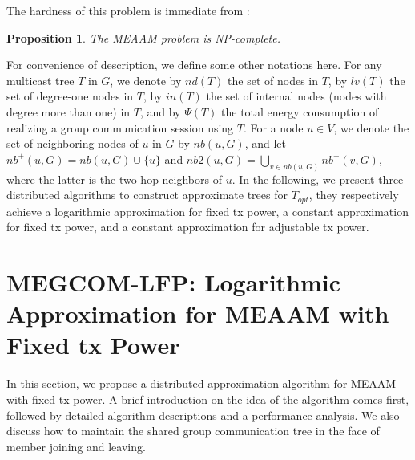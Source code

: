 \documentclass[10pt, conference, compsocconf]{IEEEtran}
\newtheorem{prop}{\textbf{Proposition}}
\begin{document}
  The hardness of this problem is immediate from \cite{Liang2009}:
\begin{prop} \label{prp:NPC}
    The MEAAM problem is NP-complete.
  \end{prop}

  For convenience of description, we define some other notations here. For any multicast tree $T$ in $G$, we denote by $\mathit{nd}(T)$ the set of nodes in $T$, by $\mathit{lv}(T)$ the set of degree-one nodes in $T$, by $\mathit{in}(T)$ the set of internal nodes (nodes with degree more than one) in $T$, and by $\Psi(T)$ the total energy consumption of realizing a group communication session using $T$. For a node $u \in V$, we denote the set of neighboring nodes of $u$ in $G$ by $\mathit{nb}(u,G)$, and let $\mathit{nb}^+(u,G) = \mathit{nb}(u,G) \cup \{u\}$ and $\mathit{nb2}(u,G) = \bigcup_{v \in \mathit{nb}(u,G)} \mathit{nb}^+(v,G)$, where the latter is the two-hop neighbors of $u$. In the following, we present three distributed algorithms to construct approximate trees for $T_{\mathit{opt}}$, they respectively achieve a logarithmic approximation for fixed tx power, a constant approximation for fixed tx power, and a constant approximation for adjustable tx power.


\section{MEGCOM-LFP: Logarithmic Approximation for MEAAM with Fixed tx Power} \label{sec:logftxp}
In this section, we propose a distributed approximation algorithm for MEAAM with fixed tx power. A brief introduction on the idea of the algorithm comes first, followed by detailed algorithm descriptions and a performance analysis. We also discuss how to maintain the shared group communication tree in the face of member joining and leaving.
\end{document}
